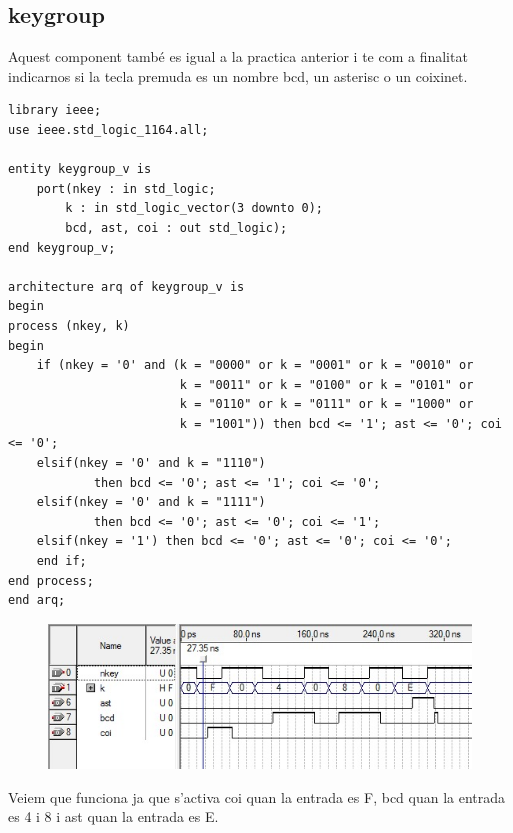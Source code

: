 \documentclass[12pt, a4papre]{article}
\begin{document}
\subsection{keygroup}

	Aquest component també es igual a la practica anterior i te com a finalitat indicarnos si la tecla premuda es un nombre bcd, un asterisc o un coixinet.
	
		\begin{lstlisting}[style=vhdl, frame=single, basicstyle=\tiny]
	library ieee;
use ieee.std_logic_1164.all;

entity keygroup_v is
	port(nkey : in std_logic;
		k : in std_logic_vector(3 downto 0);
		bcd, ast, coi : out std_logic);
end keygroup_v;

architecture arq of keygroup_v is
begin
process (nkey, k)
begin
	if (nkey = '0' and (k = "0000" or k = "0001" or k = "0010" or
						k = "0011" or k = "0100" or k = "0101" or
						k = "0110" or k = "0111" or k = "1000" or
						k = "1001")) then bcd <= '1'; ast <= '0'; coi <= '0';
	elsif(nkey = '0' and k = "1110")
			then bcd <= '0'; ast <= '1'; coi <= '0';
	elsif(nkey = '0' and k = "1111")
			then bcd <= '0'; ast <= '0'; coi <= '1';
	elsif(nkey = '1') then bcd <= '0'; ast <= '0'; coi <= '0';
	end if;
end process;
end arq;
		\end{lstlisting}
		
			\begin{figure}[H]
		\begin{center}
		\includegraphics[width=130mm]{simulaciokeygroup.jpeg}
		\end{center}
	\end{figure}	
	Veiem que funciona ja que s'activa coi quan la entrada es F, bcd quan la entrada es 4 i 8 i ast quan la entrada es E.
	
\end{document}
